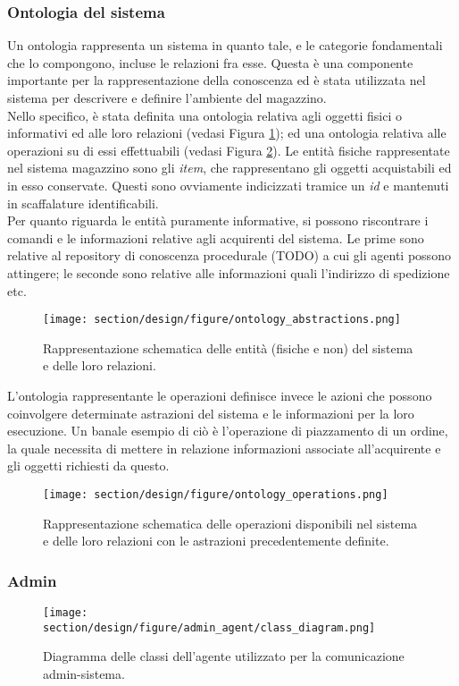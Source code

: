 \subsubsection{Ontologia del sistema}
Un ontologia rappresenta un sistema in quanto tale, e le categorie fondamentali che lo compongono, incluse le relazioni fra esse. Questa è una componente importante per la rappresentazione della conoscenza ed è stata utilizzata nel sistema per descrivere e definire l'ambiente del magazzino.\\
Nello specifico, è stata definita una ontologia relativa agli oggetti fisici o informativi ed alle loro relazioni (vedasi Figura \ref{fig:ontology_abstractions}); ed una ontologia relativa alle operazioni su di essi effettuabili (vedasi Figura \ref{fig:ontology_operations}).
\parag
Le entità fisiche rappresentate nel sistema magazzino sono gli \textit{item}, che rappresentano gli oggetti acquistabili ed in esso conservate. Questi sono ovviamente indicizzati tramice un \textit{id} e mantenuti in scaffalature identificabili.\\
Per quanto riguarda le entità puramente informative, si possono riscontrare i comandi e le informazioni relative agli acquirenti del sistema. Le prime sono relative al repository di conoscenza procedurale (TODO) a cui gli agenti possono attingere; le seconde sono relative alle informazioni quali l'indirizzo di spedizione etc. 
\begin{figure}[ht]
    \texttt{[image: section/design/figure/ontology\_abstractions.png]}
    \caption{Rappresentazione schematica delle entità (fisiche e non) del sistema e delle loro relazioni.}
    \label{fig:ontology_abstractions}
\end{figure}
\parag
L'ontologia rappresentante le operazioni definisce invece le azioni che possono coinvolgere determinate astrazioni del sistema e le informazioni per la loro esecuzione. Un banale esempio di ciò è l'operazione di piazzamento di un ordine, la quale necessita di mettere in relazione informazioni associate all'acquirente e gli oggetti richiesti da questo.
\begin{figure}[ht]
    \texttt{[image: section/design/figure/ontology\_operations.png]}%
    \caption{Rappresentazione schematica delle operazioni disponibili nel sistema e delle loro relazioni con le astrazioni precedentemente definite.}
    \label{fig:ontology_operations}
\end{figure}

\subsubsection{Admin}
\begin{figure}[ht]
    \texttt{[image: section/design/figure/admin\_agent/class\_diagram.png]}
    \caption{Diagramma delle classi dell'agente utilizzato per la comunicazione admin-sistema.}
    \label{fig:class_diagram_admin_agent}
\end{figure}

